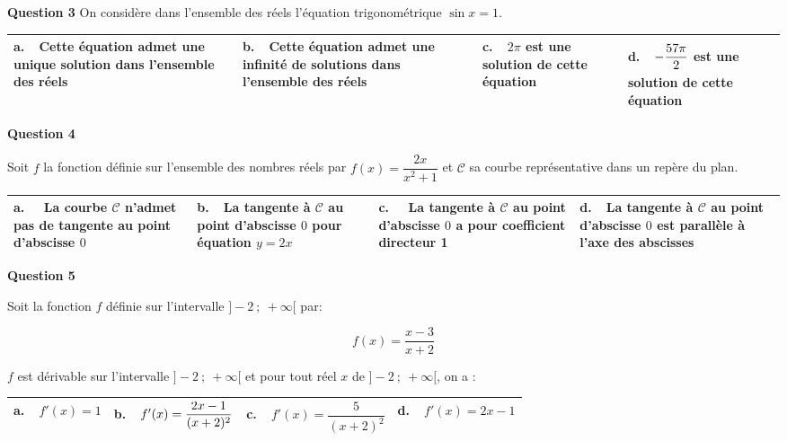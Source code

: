 \documentclass[10pt]{article}
\begin{document}
\medskip

\textbf{Question 3} On considère dans l'ensemble des réels l'équation trigonométrique $\sin x = 1$.

\begin{center}
\begin{tabularx}{\linewidth}{|*{4}{X|}}\hline
\textbf{a.~~}Cette équation admet une unique solution dans l'ensemble des réels&\textbf{b.~~}Cette équation admet une infinité de solutions dans l'ensemble des réels&\textbf{c.~~}$2\pi$ est une solution de cette équation&\textbf{d.~~}$- \dfrac{57\pi\rule{0pt}{11pt}}{2\rule[-3pt]{0pt}{0pt}}$ est une solution de cette équation\\ \hline
\end{tabularx}
\end{center}

\medskip

\textbf{Question 4}

Soit $f$ la fonction définie sur l'ensemble des nombres réels par $f(x) = \dfrac{2x}{x^2 + 1}$
et $\mathcal{C}$ sa courbe représentative dans un repère du plan.

\begin{center}
\begin{tabularx}{\linewidth}{|*{4}{X|}}\hline
\textbf{a.~~} La courbe $\mathcal{C}$ n'admet pas de tangente au point d'abscisse $0$&\textbf{b.~~}La tangente à $\mathcal{C}$ au point d'abscisse $0$ pour équation $y = 2x$&\textbf{c.~~} La tangente à $\mathcal{C}$ au point d'abscisse $0$ a pour coefficient directeur 1&\textbf{d.~~}La tangente à $\mathcal{C}$ au point d'abscisse $0$ est parallèle à l'axe des abscisses\\ \hline
\end{tabularx}
\end{center}

\medskip

\textbf{Question 5}

Soit la fonction $f$ définie sur l'intervalle $]-2~;~ +\infty[$ par:

\[f(x) = \dfrac{x - 3}{x+2}\]

$f$ est dérivable sur l'intervalle $]-2~;~ +\infty[$ et pour tout réel $x$ de $]-2~;~ +\infty[$, on a :

\begin{center}
\begin{tabularx}{\linewidth}{|*{4}{X|}}\hline
\textbf{a.~~}$f'(x) = 1$&\textbf{b.~~}$f'(x) = \dfrac{2x - 1}{(x + 2)^2\rule[-5pt]{0pt}{0pt}}$&\textbf{c.~~}$f'(x) = \dfrac{5}{(x + 2)^2}$&\textbf{d.~~}$f'(x) = 2x - 1$\rule[-3mm]{0mm}{8mm}\\ \hline
\end{tabularx}
\end{center}

\bigskip
\end{document}
